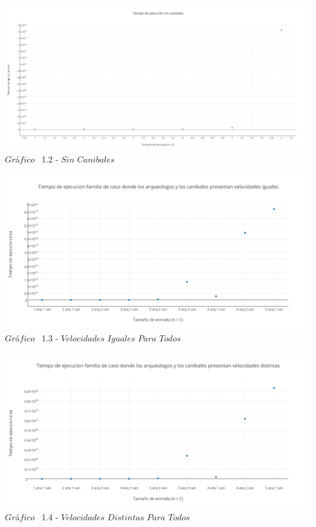  \vspace*{0.3cm} \vspace*{0.3cm}
  \begin{center}
 \includegraphics[scale=0.65]{./EJ1/sincanibales.png}
 {$Gr$\'a$fico$ \ 1.2 - $Sin$ $Canibales$}
  \end{center}
  \vspace*{0.3cm}
  
     \vspace*{0.3cm} \vspace*{0.3cm}
  \begin{center}
 \includegraphics[scale=0.65]{./EJ1/velIgual.png}
 {$Gr$\'a$fico$ \ 1.3 - $Velocidades$ $Iguales$ $Para$ $Todos$}
  \end{center}
  \vspace*{0.3cm}
  
   \vspace*{0.3cm} \vspace*{0.3cm}
  \begin{center}
 \includegraphics[scale=0.65]{./EJ1/velDistinta.png}
 {$Gr$\'a$fico$ \ 1.4 - $Velocidades$ $Distintas$ $Para$ $Todos$}
  \end{center}
  \vspace*{0.3cm}
  
